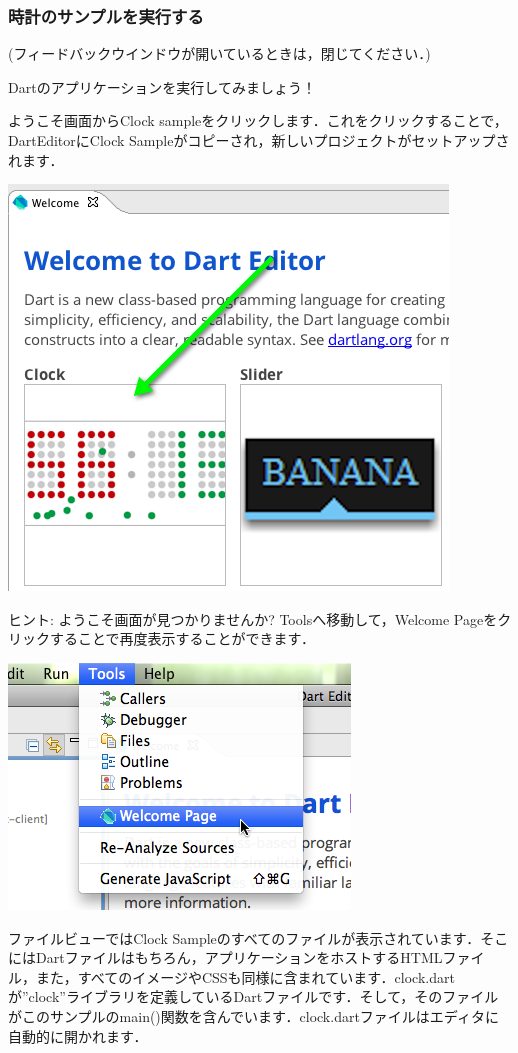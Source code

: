 \subsubsection{時計のサンプルを実行する}

(フィードバックウインドウが開いているときは，閉じてください．)

Dartのアプリケーションを実行してみましょう！

ようこそ画面からClock sampleをクリックします．これをクリックすることで，DartEditorにClock Sampleがコピーされ，新しいプロジェクトがセットアップされます．

\includegraphics{step1/clocksample1.png}

ヒント: ようこそ画面が見つかりませんか? Toolsへ移動して，Welcome Pageをクリックすることで再度表示することができます．

\includegraphics{step1/clocksample2.png}

ファイルビューではClock Sampleのすべてのファイルが表示されています．そこにはDartファイルはもちろん，アプリケーションをホストするHTMLファイル，また，すべてのイメージやCSSも同様に含まれています．clock.dartが''clock''ライブラリを定義しているDartファイルです．そして，そのファイルがこのサンプルのmain()関数を含んでいます．clock.dartファイルはエディタに自動的に開かれます．

